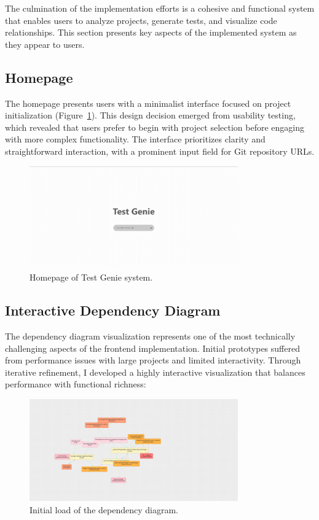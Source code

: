 The culmination of the implementation efforts is a cohesive and functional system that enables users to analyze projects, generate tests, and visualize code relationships. This section presents key aspects of the implemented system as they appear to users.

\subsection{Homepage}

The homepage presents users with a minimalist interface focused on project initialization (Figure~\ref{fig:homepage}). This design decision emerged from usability testing, which revealed that users prefer to begin with project selection before engaging with more complex functionality. The interface prioritizes clarity and straightforward interaction, with a prominent input field for Git repository URLs.

\begin{figure}[H]
    \centering
    \includegraphics[width=0.8\textwidth]{images/homepage.png}
    \caption{Homepage of Test Genie system.}
    \label{fig:homepage}
\end{figure}

\subsection{Interactive Dependency Diagram}

The dependency diagram visualization represents one of the most technically challenging aspects of the frontend implementation. Initial prototypes suffered from performance issues with large projects and limited interactivity. Through iterative refinement, I developed a highly interactive visualization that balances performance with functional richness:

\begin{figure}[H] 
    \centering
    \includegraphics[width=0.8\textwidth]{images/diagram-initial_load.png}
    \caption{Initial load of the dependency diagram.}
    \label{fig:diagram-initial_load}
\end{figure}

